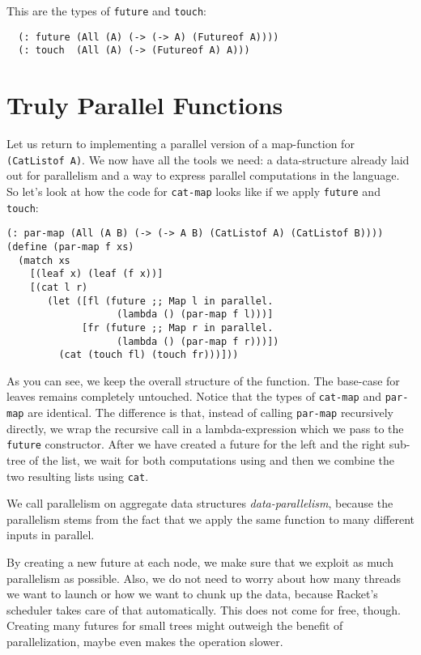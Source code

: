 \documentclass{article}
\begin{document}
This are the types of \lstinline{future} and \lstinline{touch}:

\begin{lstlisting}
  (: future (All (A) (-> (-> A) (Futureof A))))
  (: touch  (All (A) (-> (Futureof A) A)))
\end{lstlisting}

\section{Truly Parallel Functions}

Let us return to implementing a parallel version of a map-function for \lstinline{(CatListof A)}. We now have all the tools we need: a data-structure already laid out for parallelism and a way to express parallel computations in the language. So let's look at how the code for \lstinline{cat-map} looks like if we apply \lstinline{future} and \lstinline{touch}:

\begin{lstlisting}
(: par-map (All (A B) (-> (-> A B) (CatListof A) (CatListof B))))
(define (par-map f xs)
  (match xs
    [(leaf x) (leaf (f x))]
    [(cat l r)
       (let ([fl (future ;; Map l in parallel.
                   (lambda () (par-map f l)))]
             [fr (future ;; Map r in parallel.
                   (lambda () (par-map f r)))])
         (cat (touch fl) (touch fr)))]))
\end{lstlisting}

As you can see, we keep the overall structure of the function. The base-case for leaves remains completely untouched. Notice that the types of \lstinline{cat-map} and \lstinline{par-map} are identical. The difference is that, instead of calling \lstinline{par-map} recursively directly, we wrap the recursive call in a lambda-expression which we pass to the \lstinline{future} constructor. After we have created a future for the left and the right sub-tree of the list, we wait for both computations using  and then we combine the two resulting lists using \lstinline{cat}.

We call parallelism on aggregate data structures \emph{data-parallelism}, because the parallelism stems from the fact that we apply the same function to many different inputs in parallel.

By creating a new future at each node, we make sure that we exploit as much parallelism as possible. Also, we do not need to worry about how many threads we want to launch or how we want to chunk up the data, because Racket's scheduler takes care of that automatically. This does not come for free, though. Creating many futures for small trees might outweigh the benefit of parallelization, maybe even makes the operation slower.
\end{document}
